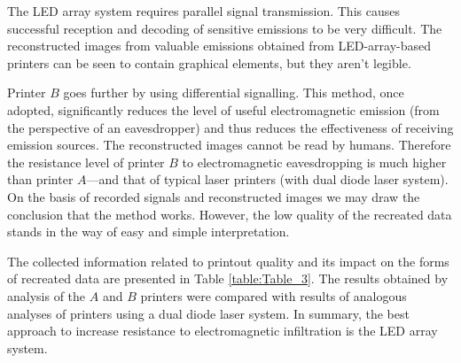 \documentclass[12pt,a4paper]{article}
\begin{document}
The LED array system requires parallel signal transmission. This causes
successful reception and decoding of sensitive emissions to be very
difficult. The reconstructed images from valuable emissions obtained from
LED-array-based printers can be seen to contain graphical elements, but they
aren't legible.

Printer $B$ goes further by using differential signalling. This method, once
adopted, significantly reduces the level of useful electromagnetic emission
(from the perspective of an eavesdropper) and thus reduces the effectiveness
of receiving emission sources. The reconstructed images cannot be read by
humans. Therefore the resistance level of printer $B$ to electromagnetic
eavesdropping is much higher than printer $A$---and that of typical
laser printers (with dual diode laser system). On the basis of recorded
signals and reconstructed images we may draw the conclusion that the method
works. However, the low quality of the recreated data stands in the way of
easy and simple interpretation.

The collected information related to printout quality and its impact on the
forms of recreated data are presented in Table \ref{table:Table_3}. The
results obtained by analysis of the $A$ and $B$ printers were compared with
results of analogous analyses of printers using a dual diode laser system. In
summary, the best approach to increase resistance to electromagnetic
infiltration is the LED array system.

\singlespacing



\end{document}
